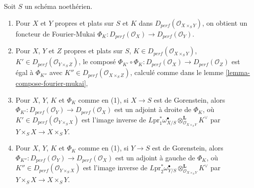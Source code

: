 \begin{lemma}
\label{lemma-fourier-mukai-flat-proper-over-noetherian}
Soit $S$ un schéma noethérien.
\begin{enumerate}
\item Pour $X$ et $Y$ propres et plats sur $S$ et $K$ dans
$D_{perf}(\mathcal{O}_{X \times_S Y})$, on obtient un foncteur de Fourier-Mukai
$\Phi_K : D_{perf}(\mathcal{O}_X) \to D_{perf}(\mathcal{O}_Y)$.
\item Pour $X$, $Y$ et $Z$ propres et plats sur $S$, $K \in
D_{perf}(\mathcal{O}_{X \times_S Y})$, $K' \in
D_{perf}(\mathcal{O}_{Y \times_S Z})$, le composé
$\Phi_{K'} \circ \Phi_K : D_{perf}(\mathcal{O}_X) \to D_{perf}(\mathcal{O}_Z)$
est égal à $\Phi_{K''}$ avec $K'' \in D_{perf}(\mathcal{O}_{X \times_S Z})$,
calculé comme dans le lemme \ref{lemma-compose-fourier-mukai},
\item Pour $X$, $Y$, $K$ et $\Phi_K$ comme en (1), si $X \to S$ est de Gorenstein, alors
$\Phi_{K'} : D_{perf}(\mathcal{O}_Y) \to D_{perf}(\mathcal{O}_X)$ est un adjoint
à droite de $\Phi_K$, où $K' \in D_{perf}(\mathcal{O}_{Y \times_S X})$
est l'image inverse de $L\text{pr}_1^*\omega_{X/S}^\bullet
\otimes_{\mathcal{O}_{X \times_S Y}}^\mathbf{L} K^\vee$ par
$Y \times_S X \to X \times_S Y$.
\item Pour $X$, $Y$, $K$ et $\Phi_K$ comme en (1), si $Y \to S$ est de Gorenstein, alors
$\Phi_{K''} : D_{perf}(\mathcal{O}_Y) \to D_{perf}(\mathcal{O}_X)$ est un adjoint
à gauche de $\Phi_K$, où $K'' \in D_{perf}(\mathcal{O}_{Y \times_S X})$
est l'image inverse de $L\text{pr}_2^*\omega_{Y/S}^\bullet
\otimes_{\mathcal{O}_{X \times_S Y}}^\mathbf{L} K^\vee$ par
$Y \times_S X \to X \times_S Y$.
\end{enumerate}
\end{lemma}

